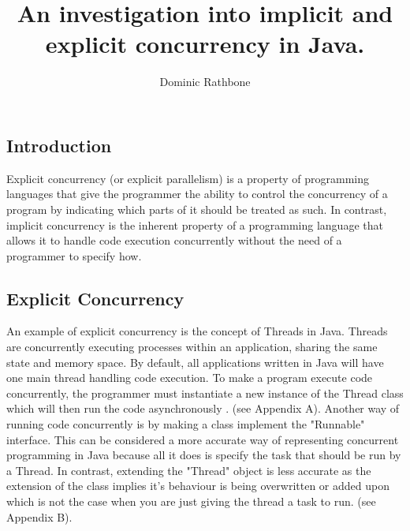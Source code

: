 \documentclass[]{report}
\title{An investigation into implicit and explicit concurrency in Java.}
\author{Dominic Rathbone}
\begin{document}
\maketitle

\subsection{Introduction}
Explicit concurrency (or explicit parallelism) is a property of programming languages that give the programmer the ability to control the concurrency of a program by indicating which parts of it should be treated as such. In contrast, implicit concurrency is the inherent property of a programming language that allows it to handle code execution concurrently without the need of a programmer to specify how.

\subsection{Explicit Concurrency}
An example of explicit concurrency is the concept of Threads in Java. Threads are concurrently executing processes within an application, sharing the same state and memory space. By default, all applications written in Java will have one main thread handling code execution. To make a program execute code concurrently, the programmer must instantiate a new instance of the Thread class which will then run the code asynchronously \cite{Threading}. (see Appendix A). Another way of running code concurrently is by making a class implement the "Runnable" interface.\cite{Threading} This can be considered a more accurate way of representing concurrent programming in Java because all it does is specify the task that should be run by a Thread. In contrast, extending the "Thread" object is less accurate as the extension of the class implies it's behaviour is being overwritten or added upon which is not the case when you are just giving the thread a task to run. (see Appendix B).
\end{document}
